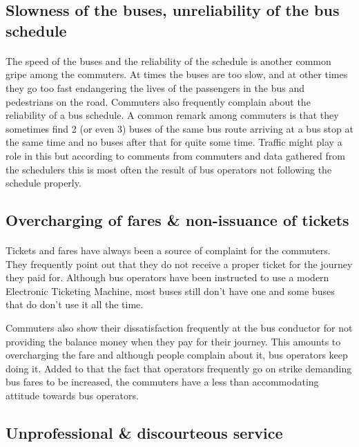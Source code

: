 \subsection{Slowness of the buses, unreliability of the bus schedule}

\paragraph{} The speed of the buses and the reliability of the schedule is another common gripe among the commuters. At times the buses are too slow, and at other times they go too fast endangering the lives of the passengers in the bus and pedestrians on the road. Commuters also frequently complain about the reliability of a bus schedule. A common remark among commuters is that they sometimes find 2 (or even 3) buses of the same bus route arriving at a bus stop at the same time and no buses after that for quite some time. Traffic might play a role in this but according to comments from commuters and data gathered from the schedulers this is most often the result of bus operators not following the schedule properly.

\subsection{Overcharging of fares \& non-issuance of tickets}

\paragraph{} Tickets and fares have always been a source of complaint for the commuters. They frequently point out that they do not receive a proper ticket for the journey they paid for. Although bus operators have been instructed to use a modern Electronic Ticketing Machine, most buses still don't have one and some buses that do don't use it all the time.

Commuters also show their dissatisfaction frequently at the bus conductor for not providing the balance money when they pay for their journey. This amounts to overcharging the fare and although people complain about it, bus operators keep doing it. Added to that the fact that operators frequently go on strike demanding bus fares to be increased, the commuters have a less than accommodating attitude towards bus operators.

\subsection{Unprofessional \& discourteous service}

